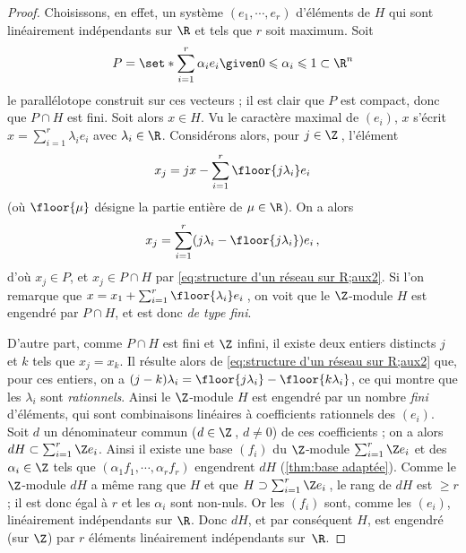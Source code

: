 \documentclass[11pt, useosf,
  title in boldface,
  theorem in new line,
  theorem numbering = section,
  number theorems separately,
]{simplivre}
\begin{document}
    \begin{proof}
        Choisissons, en effet, un système \( (e_1, \cdots, e_r) \) d'éléments de \( H \) qui sont linéairement indépendants sur \( \R \) et tels que \( r \) soit maximum. Soit
        \begin{equation}\label{eq:structure d'un réseau sur R;aux1}
            P = \set*{ \sum_{i=1}^r \alpha_i e_i \given 0 \leqslant \alpha_i \leqslant 1 } \subset \R^n
        \end{equation}
        le parallélotope construit sur ces vecteurs ; il est clair que \( P \) est compact, donc que \( P \cap H \) est fini. Soit alors \( x \in H \). Vu le caractère maximal de \( (e_i) \), \( x \) s'écrit \( x = \sum_{i=1}^r \lambda_i e_i \) avec \( \lambda_i \in \R \). Considérons alors, pour \( j \in \Z \)\,, l'élément
        \begin{equation}\label{eq:structure d'un réseau sur R;aux2}
            x_j = jx - \sum_{i=1}^r \floor{j\lambda_i} e_i
        \end{equation}
        (où \( \floor{\mu} \) désigne la partie entière de \( \mu \in \R \)). On a alors
        \[
            x_j = \sum_{i=1}^r (j \lambda_i - \floor{j\lambda_i}) e_i \,,
        \]
        d'où \( x_j \in P \), et \( x_j \in P \cap H \) par \eqref{eq:structure d'un réseau sur R;aux2}. Si l'on remarque que \( x = x_1 + \sum_{i=1}^r \floor{\lambda_i} e_i \)\,, on voit que le \( \Z \)‑module \( H \) est engendré par \( P \cap H \), et est donc \emph{de type fini}.

        D'autre part, comme \( P \cap H \) est fini et \( \Z \) infini, il existe deux entiers distincts \( j \) et \( k \) tels que \( x_j = x_k \). Il résulte alors de \eqref{eq:structure d'un réseau sur R;aux2} que, pour ces entiers, on a \( (j-k) \lambda_i = \floor{j\lambda_i} - \floor{k\lambda_i} \), ce qui montre que les \( \lambda_i \) sont \emph{rationnels}. Ainsi le \( \Z \)‑module \( H \) est engendré par un nombre \emph{fini} d'éléments, qui sont combinaisons linéaires à coefficients rationnels des \( (e_i) \). Soit \( d \) un dénominateur commun (\( d \in \Z \)\,, \( d \neq 0 \)) de ces coefficients ; on a alors \( d H \subset \sum_{i=1}^r \Z e_i \). Ainsi il existe une base \( (f_i) \) du \( \Z \)‑module \( \sum_{i=1}^r \Z e_i \) et des \( \alpha_i \in \Z \) tels que \( (\alpha_1 f_1, \cdots, \alpha_r f_r) \) engendrent \( dH \) (\cref{thm:base adaptée}). Comme le \( \Z \)‑module \( dH \) a même rang que \( H \) et que \( H \supset \sum_{i=1}^r \Z e_i \)\,, le rang de \( dH \) est \( \geqslant r \) ; il est donc égal à \( r \) et les \( \alpha_i \) sont non-nuls. Or les \( (f_i) \) sont, comme les \( (e_i) \), linéairement indépendants sur \( \R \). Donc \( dH \), et par conséquent \( H \), est engendré (sur \( \Z \)) par \( r \) éléments linéairement indépendants sur~\( \R \).
    \end{proof}
\end{document}

